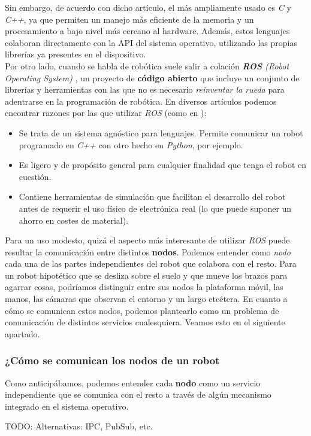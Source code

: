 Sin embargo, de acuerdo con dicho artículo, el más ampliamente usado es \textit{C} y \textit{C++}, ya que permiten un manejo más eficiente de la memoria y un procesamiento a bajo nivel más cercano al hardware. Además, estos lenguajes colaboran directamente con la API del sistema operativo, utilizando las propias librerías ya presentes en el dispositivo.\\

Por otro lado, cuando se habla de robótica suele salir a colación \textit{\textbf{ROS} (Robot Operating System)} \cite{why-ros}, un proyecto de \textbf{código abierto} que incluye un conjunto de librerías y herramientas con las que no es necesario \textit{reinventar la rueda} para adentrarse en la programación de robótica. En diversos artículos podemos encontrar razones por las que utilizar \textit{ROS} (como en \cite{reasons-ros}):

\begin{itemize}
	\item Se trata de un sistema agnóstico para lenguajes. Permite comunicar un robot programado en \textit{C++} con otro hecho en \textit{Python}, por ejemplo.
	\item Es ligero y de propósito general para cualquier finalidad que tenga el robot en cuestión.
	\item Contiene herramientas de simulación que facilitan el desarrollo del robot antes de requerir el uso físico de electrónica real (lo que puede suponer un ahorro en costes de material).
\end{itemize}

Para un uso modesto, quizá el aspecto más interesante de utilizar \textit{ROS} puede resultar la comunicación entre distintos \textbf{nodos}. Podemos entender como \textit{nodo} cada una de las partes independientes del robot que colabora con el resto. Para un robot hipotético que se desliza sobre el suelo y que mueve los brazos para agarrar cosas, podríamos distinguir entre sus nodos la plataforma móvil, las manos, las cámaras que observan el entorno y un largo etcétera. En cuanto a cómo se comunican estos nodos, podemos plantearlo como un problema de comunicación de distintos servicios cualesquiera. Veamos esto en el siguiente apartado.\\


\subsubsection{¿Cómo se comunican los nodos de un robot}

Como anticipábamos, podemos entender cada \textbf{nodo} como un servicio independiente que se comunica con el resto a través de algún mecanismo integrado en el sistema operativo.

TODO: Alternativas: IPC, PubSub, etc.